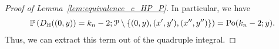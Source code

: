 \begin{proof}[Proof of Lemma~\ref{lem:equivalence_c_HP_P}]
In particular, we have 
\begin{equation*}
\begin{split} 
\Prob{D_\H ((0,y))=k_n-2;\Pcal \setminus \{ (0,y),(x',y'), (x'',y'')\}} =\Pop{y}{k_n-2}.
\end{split}
\end{equation*}
Thus, we can extract this term out of the quadruple integral. 


\end{proof}
